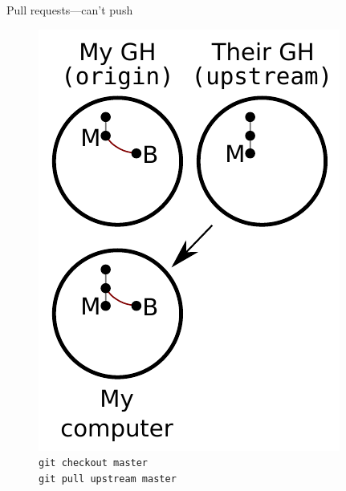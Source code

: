\begin{frame}{Pull requests---can't push}
  \begin{figure}
    \includegraphics{fork_007.pdf}
    \\ \texttt{git checkout master}
    \\ \texttt{git pull upstream master}
  \end{figure}
\end{frame}

